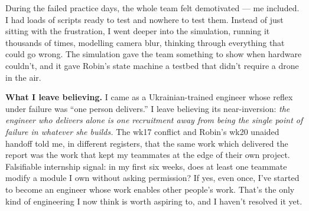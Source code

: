 During the failed practice days, the whole team felt demotivated --- me included. I had loads of scripts ready to test and nowhere to test them. Instead of just sitting with the frustration, I went deeper into the simulation, running it thousands of times, modelling camera blur, thinking through everything that could go wrong. The simulation gave the team something to show when hardware couldn't, and it gave Robin's state machine a testbed that didn't require a drone in the air.

\textbf{What I leave believing.} I came as a Ukrainian-trained engineer whose reflex under failure was ``one person delivers.'' I leave believing its near-inversion: \emph{the engineer who delivers alone is one recruitment away from being the single point of failure in whatever she builds.} The wk17 conflict and Robin's wk20 unaided handoff told me, in different registers, that the same work which delivered the report was the work that kept my teammates at the edge of their own project. Falsifiable internship signal: in my first six weeks, does at least one teammate modify a module I own without asking permission? If yes, even once, I've started to become an engineer whose work enables other people's work. That's the only kind of engineering I now think is worth aspiring to, and I haven't resolved it yet.
